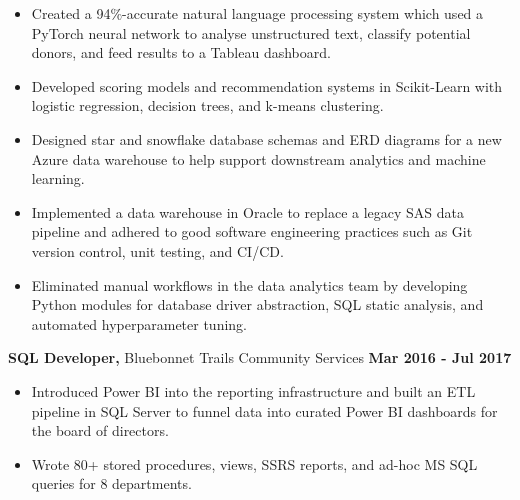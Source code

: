 \documentclass [
        11pt
] {article}
\begin{document}
\begin{itemize}[itemsep=1pt,topsep=1pt]
\renewcommand{\labelitemi}{\scriptsize$\blacksquare$}

\item Created a 94$\%$-accurate natural language processing system which used a PyTorch
neural network to analyse unstructured text, classify potential donors, and
feed results to a Tableau dashboard.

\item Developed scoring models and recommendation systems in Scikit-Learn with
logistic regression, decision trees, and k-means clustering. 

\item Designed star and snowflake database schemas and ERD diagrams for a new Azure data
warehouse to help support downstream analytics and machine learning.

\item Implemented a data warehouse in Oracle to replace a legacy SAS data
pipeline and adhered to good software engineering practices such as Git version control,
unit testing, and CI/CD.

\item Eliminated manual workflows in the data analytics team by developing Python modules 
for database driver abstraction, SQL static analysis, and automated hyperparameter tuning.

\end{itemize}

\vspace*{5pt}




\noindent \textbf{SQL Developer,} Bluebonnet Trails Community Services
\hspace*{\fill} \textbf{Mar 2016 - Jul 2017}

\begin{itemize}[itemsep=1pt,topsep=1pt]
\renewcommand{\labelitemi}{\scriptsize$\blacksquare$}

\item Introduced Power BI into the reporting infrastructure and built an ETL
pipeline in SQL Server to funnel data into curated Power BI dashboards for 
the board of directors.

\item Wrote 80+ stored procedures, views, SSRS reports, and ad-hoc
MS SQL queries for 8 departments.

\end{itemize}

\vspace*{5pt}
\end{document}
